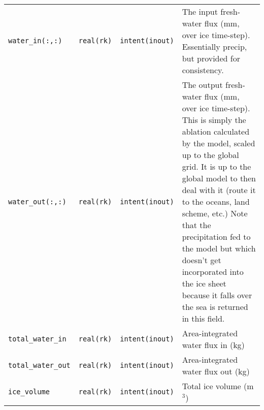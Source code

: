 \begin{center}
\begin{supertabular}{lllp{5.5cm}}
    \texttt{water\_in(:,:)} & \texttt{real(rk)} & \texttt{intent(inout)} & The
    input fresh-water flux (mm, over ice time-step). Essentially precip, but
    provided for consistency.\\
    \texttt{water\_out(:,:)} & \texttt{real(rk)} & \texttt{intent(inout)} & The
    output fresh-water flux (mm, over ice time-step). This is simply the ablation calculated by
    the model, scaled up to the global grid. It is up to the global model to
    then  deal with it (route it to the oceans, land scheme, etc.) Note that
    the precipitation fed to the model but which doesn't get incorporated into
    the ice sheet because it falls over the sea is returned in this field. \\ 
    \texttt{total\_water\_in} & \texttt{real(rk)} & \texttt{intent(inout)} &
    Area-integrated water flux in (kg)\\ 
    \texttt{total\_water\_out} & \texttt{real(rk)} & \texttt{intent(inout)} &
    Area-integrated water flux out (kg)\\
    \texttt{ice\_volume} & \texttt{real(rk)} & \texttt{intent(inout)} & Total ice volume (m$^3$)\\
  \end{supertabular}
\end{center}
